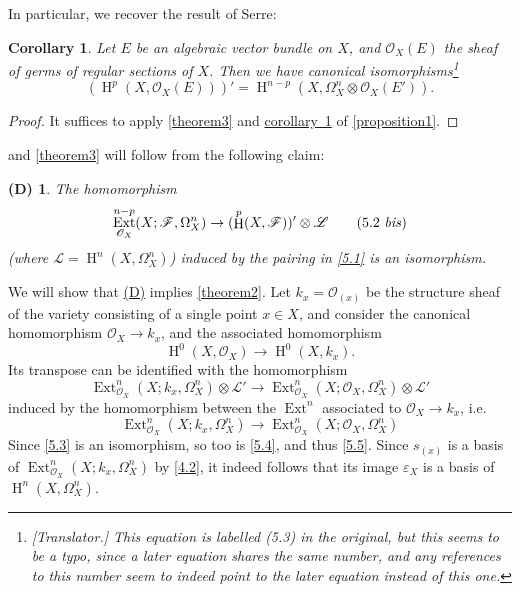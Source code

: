 \documentclass{article}
\theoremstyle{plain}
\newtheorem*{corollary*}{Corollary}
\newtheorem*{denv}{(D)}
\theoremstyle{definition}
\newcommand{\sh}[1]{{\mathscr{#1}}}
\DeclareMathOperator{\Ext}{Ext}
\DeclareMathOperator{\HH}{H}
\newcommand{\oldpage}[1]{\marginpar{\footnotesize$\Big\vert$ \textit{p.~#1}}}
\begin{document}
In particular, we recover the result of Serre:

\begin{corollary*}
\label{theorem3corollary}
  \renewcommand*{\thefootnote}{\fnsymbol{footnote}}
  Let $E$ be an algebraic vector bundle on $X$, and $\sh{O}_X(E)$ the sheaf of germs of regular sections of $X$.
  Then we have canonical isomorphisms\footnote{\emph{[Translator.] This equation is labelled (5.3) in the original, but this seems to be a typo, since a later equation shares the same number, and any references to this number seem to indeed point to the later equation instead of this one.}}
  \[
    (\HH^p(X,\sh{O}_X(E)))' = \HH^{n-p}(X,\Omega_X^n\otimes\sh{O}_X(E')).
  \]
\end{corollary*}

\begin{proof}
  It suffices to apply \cref{theorem3} and \hyperref[proposition1corollary1]{corollary~1} of \cref{proposition1}.
\end{proof}

 and \cref{theorem3} will follow from the following claim:

\begin{denv}
\label{(D)}
  The homomorphism
  \[
  \label{5.2bis}
    \Ext_{\sh{O}_X}^{n-p}(X;\sh{F},\Omega_X^n) \to (\HH^p(X,\sh{F}))'\otimes\sh{L}
  \tag{5.2 \emph{bis}}
  \]
  (where $\sh{L}=\HH^n(X,\Omega_X^n)$) induced by the pairing in \cref{5.1} is an isomorphism.
\end{denv}

We will show that \hyperref[(D)]{(D)} implies \cref{theorem2}.
Let $k_x=\sh{O}_{(x)}$ be the structure sheaf of the variety consisting of a single point $x\in X$, and consider the canonical homomorphism $\sh{O}_X\to k_x$, and the associated homomorphism
\[
\label{5.3}
  \HH^0(X,\sh{O}_X) \to \HH^0(X,k_x).
\tag{5.3}
\]
Its transpose can be identified with the homomorphism
\[
\label{5.4}
  \Ext_{\sh{O}_X}^n(X;k_x,\Omega_X^n)\otimes\sh{L}' \to \Ext_{\sh{O}_X}^n(X;\sh{O}_X,\Omega_X^n)\otimes\sh{L}'
\tag{5.4}
\]
induced by the homomorphism between the $\Ext^n$ associated to $\sh{O}_X\to k_x$, i.e.
\[
\label{5.5}
  \Ext_{\sh{O}_X}^n(X;k_x,\Omega_X^n) \to \Ext_{\sh{O}_X}^n(X;\sh{O}_X,\Omega_X^n)
\tag{5.5}
\]
\oldpage{149-15}
Since \cref{5.3} is an isomorphism, so too is \cref{5.4}, and thus \cref{5.5}.
Since $s_{(x)}$ is a basis of $\Ext_{\sh{O}_X}^n(X;k_x,\Omega_X^n)$ by \cref{4.2}, it indeed follows that its image $\varepsilon_X$ is a basis of $\HH^n(X,\Omega_X^n)$.
\end{document}
